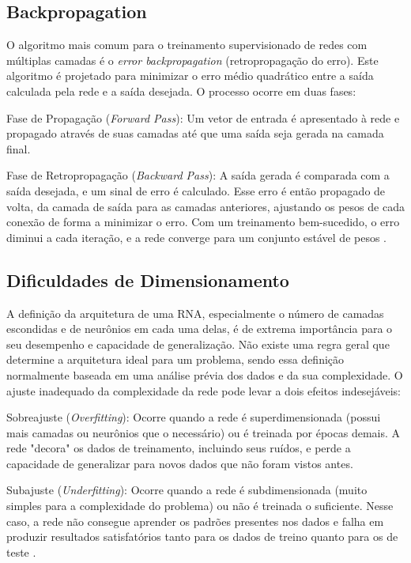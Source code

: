 \subsection{Backpropagation}

O algoritmo mais comum para o treinamento supervisionado de redes com múltiplas camadas é o
\textit{error backpropagation} (retropropagação do erro). Este algoritmo é projetado para
minimizar o erro médio quadrático entre a saída calculada pela rede e a saída desejada. O
processo ocorre em duas fases:

Fase de Propagação (\textit{Forward Pass}): Um vetor de entrada é apresentado à rede e
propagado através de suas camadas até que uma saída seja gerada na camada final.

Fase de Retropropagação (\textit{Backward Pass}): A saída gerada é comparada com a saída
desejada, e um sinal de erro é calculado. Esse erro é então propagado de volta, da camada de
saída para as camadas anteriores, ajustando os pesos de cada conexão de forma a minimizar o
erro. Com um treinamento bem-sucedido, o erro diminui a cada iteração, e a rede converge para
um conjunto estável de pesos \cite{andrade2011redes}.

\subsection{Dificuldades de Dimensionamento}
\label{subsec:dimensionamento}

A definição da arquitetura de uma RNA, especialmente o número de camadas escondidas e de
neurônios em cada uma delas, é de extrema importância para o seu desempenho e capacidade de
generalização. Não existe uma regra geral que determine a arquitetura ideal para um problema,
sendo essa definição normalmente baseada em uma análise prévia dos dados e da sua complexidade.
O ajuste inadequado da complexidade da rede pode levar a dois efeitos indesejáveis:

Sobreajuste (\textit{Overfitting}): Ocorre quando a rede é superdimensionada (possui mais
camadas ou neurônios que o necessário) ou é treinada por épocas demais. A rede "decora" os
dados de treinamento, incluindo seus ruídos, e perde a capacidade de generalizar para novos
dados que não foram vistos antes.

Subajuste (\textit{Underfitting}): Ocorre quando a rede é subdimensionada (muito simples para
a complexidade do problema) ou não é treinada o suficiente. Nesse caso, a rede não consegue
aprender os padrões presentes nos dados e falha em produzir resultados satisfatórios tanto para
os dados de treino quanto para os de teste \cite{andrade2011redes}.

